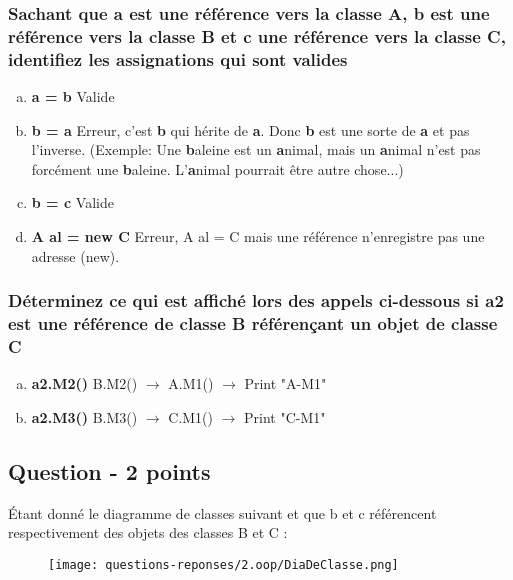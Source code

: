 \subsubsection{Sachant que a est une référence vers la classe A, b est une référence vers la classe B et c une référence vers la classe C, identifiez les assignations qui sont valides}
\begin{enumerate}[a)]
	\item \textbf{a = b} \textcolor[rgb]{0,0.48,0.58}{Valide}
	\item \textbf{b = a} \textcolor[rgb]{0,0.48,0.58}{Erreur, c'est \textbf{b} qui hérite de \textbf{a}. Donc \textbf{b} est une sorte de \textbf{a} et pas l'inverse. (Exemple: Une \textbf{b}aleine est un \textbf{a}nimal, mais un \textbf{a}nimal n'est pas forcément une \textbf{b}aleine. L'\textbf{a}nimal pourrait être autre chose...)}
	\item \textbf{b = c} \textcolor[rgb]{0,0.48,0.58}{Valide}
	\item \textbf{A al = new C} \textcolor[rgb]{0,0.48,0.58}{Erreur, A al = C mais une référence n'enregistre pas une adresse (new).}
\end{enumerate}



\subsubsection{Déterminez ce qui est affiché lors des appels ci-dessous si a2 est une référence de classe B référençant un objet de classe C}
\begin{enumerate}[a)]
	\item \textbf{a2.M2()} \textcolor[rgb]{0,0.48,0.58}{B.M2() $\rightarrow$ A.M1() $\rightarrow$ Print "A-M1"}
	\item \textbf{a2.M3()} \textcolor[rgb]{0,0.48,0.58}{B.M3() $\rightarrow$ C.M1() $\rightarrow$ Print "C-M1"}
\end{enumerate}



\subsection{Question - 2 points}
Étant donné le diagramme de classes suivant et que b et c référencent respectivement des objets des classes B et C :
\begin{figure}[ht]
	\centering
		\texttt{[image: questions-reponses/2.oop/DiaDeClasse.png]}
	\label{fig:DiaDeClasse}
\end{figure}



